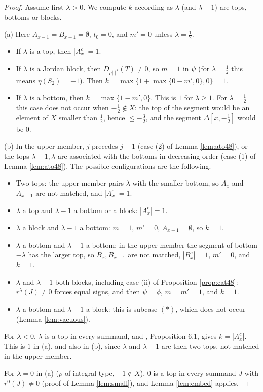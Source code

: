 \documentclass[a4paper,12pt,leqno]{amsart}
\theoremstyle{plain}
\theoremstyle{definition}
\begin{document}
\begin{proof}
Assume first $\lambda>0$. We compute $k$ according as $\lambda$ (and $\lambda-1$) are tops, bottoms or blocks.

(a) Here $A_{x-1}=B_{x-1}=\emptyset$, $t_0=0$, and $m'=0$ unless $\lambda=\tfrac12$.
\begin{itemize}
\item If $\lambda$ is a top, then $|A^c_x|=1$.
\item If $\lambda$ is a Jordan block, then $D_{\rho|\cdot|^\lambda}(T)\neq0$, so $m=1$ in $\psi$
(for $\lambda=\tfrac12$ this means $\eta(S_2)=+1$). Then $k=\max\{1+\max\{0-m',0\},0\}=1$.
\item If $\lambda$ is a bottom, then $k=\max\{1-m',0\}$. This is $1$ for
$\lambda\geq1$. For $\lambda=\tfrac12$ this case does not occur when $-\tfrac12\notin X$: the top of
the segment would be an element of $X$ smaller than $\tfrac12$, hence $\leq-\tfrac32$, and the
segment $\Delta[x,-\tfrac12]$ would be $0$.
\end{itemize}

(b) In the upper member, $j$ precedes $j-1$ (case (2) of Lemma \ref{lem:ato48}), or the tops
$\lambda-1,\lambda$ are associated with the bottoms in decreasing order (case (1) of Lemma \ref{lem:ato48}). The possible configurations are the following.
\begin{itemize}
\item Two tops: the upper member pairs $\lambda$ with the smaller bottom, so $A_x$ and
$A_{x-1}$ are not matched, and $|A^c_x|=1$.
\item $\lambda$ a top and $\lambda-1$ a bottom or a block: $|A^c_x|=1$.
\item $\lambda$ a block and $\lambda-1$ a bottom: $m=1$, $m'=0$, $A_{x-1}=\emptyset$, so $k=1$.
\item $\lambda$ a bottom and $\lambda-1$ a bottom: in the upper member the segment of bottom
$-\lambda$ has the larger top, so $B_x,B_{x-1}$ are not matched, $|B^c_x|=1$, $m'=0$, and $k=1$.
\item $\lambda$ and $\lambda-1$ both blocks, including case (ii) of Proposition \ref{prop:cat48}: $r^\lambda(J)\neq0$ forces equal
signs, and then $\psi=\phi$, $m=m'=1$, and $k=1$.
\item $\lambda$ a bottom and $\lambda-1$ a block: this is subcase $(\ast)$, which does not occur
(Lemma \ref{lem:vacuous}).
\end{itemize}
For $\lambda<0$, $\lambda$ is a top in every summand, and \cite{AM23}, Proposition 6.1, gives $k=|A^c_x|$.
This is $1$ in (a), and also in (b), since $\lambda$ and $\lambda-1$ are then two tops, not matched in the
upper member.

For $\lambda=0$ in (a) ($\rho$ of integral type, $-1\notin X$), $0$ is a top in every summand $J$
with $r^0(J)\neq0$ (proof of Lemma \ref{lem:small}), and Lemma \ref{lem:embed} applies.
\end{proof}
\end{document}
